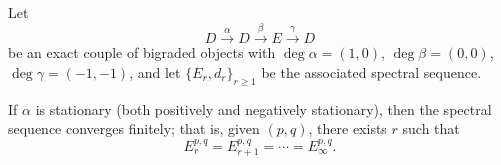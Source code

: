 Let
\[
D \xrightarrow{\alpha} D \xrightarrow{\beta} E \xrightarrow{\gamma} D
\]
be an exact couple of bigraded objects with $\deg \alpha = (1,0)$, $\deg \beta = (0,0)$, $\deg \gamma = (-1,-1)$, and let $\{E_r, d_r\}_{r \geq 1}$ be the associated spectral sequence.

If $\alpha$ is stationary (both positively and negatively stationary), then the spectral sequence converges finitely; that is, given $(p,q)$, there exists $r$ such that
\[
E_r^{p,q} = E_{r+1}^{p,q} = \cdots = E_\infty^{p,q}.
\]
